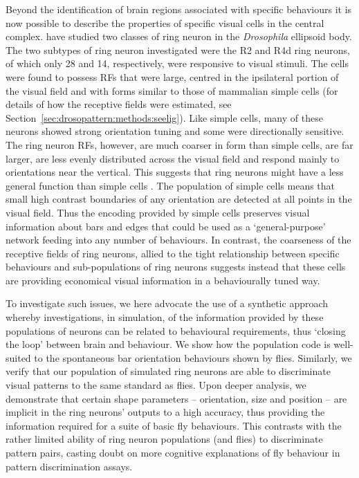 Beyond the identification of brain regions associated with specific behaviours it is now possible to describe the properties of specific visual cells in the central complex.  have studied two classes of ring neuron in the \emph{Drosophila} ellipsoid body.
The two subtypes of ring neuron investigated were the R2 and R4d ring neurons, of which only 28 and 14, respectively, were responsive to visual stimuli.
The cells were found to possess \acp{RF} that were large, centred in the ipsilateral portion of the visual field and with forms similar to those of mammalian simple cells \cite{Hubel1962} (for details of how the receptive fields were estimated, see Section~\ref{sec:drosopattern:methods:seelig}).
Like simple cells, many of these neurons showed strong orientation tuning and some were directionally sensitive.
The ring neuron \acp{RF}, however, are much coarser in form than simple cells, are far larger, are less evenly distributed across the visual field and respond mainly to orientations near the vertical.
This suggests that ring neurons might have a less general function than simple cells \cite{Wystrach2014CB}.
The population of simple cells means that small high contrast boundaries of any orientation are detected at all points in the visual field.
Thus the encoding provided by simple cells preserves visual information about bars and edges that could be used as a `general-purpose' network feeding into any number of behaviours.
In contrast, the coarseness of the receptive fields of ring neurons, allied to the tight relationship between specific behaviours and sub-populations of ring neurons suggests instead that these cells are providing economical visual information in a behaviourally tuned way.

To investigate such issues, we here advocate the use of a synthetic approach whereby investigations, in simulation, of the information provided by these populations of neurons can be related to behavioural requirements, thus `closing the loop' between brain and behaviour. We show how the population code is well-suited to the spontaneous bar orientation behaviours shown by flies. Similarly, we verify that our population of simulated ring neurons are able to discriminate visual patterns to the same standard as flies.
Upon deeper analysis, we demonstrate that certain shape parameters -- orientation, size and position -- are implicit in the ring neurons' outputs to a high accuracy, thus providing the information required for a suite of basic fly behaviours.
This contrasts with the rather limited ability of ring neuron populations (and flies) to discriminate pattern pairs, casting doubt on more cognitive explanations of fly behaviour in pattern discrimination assays.
